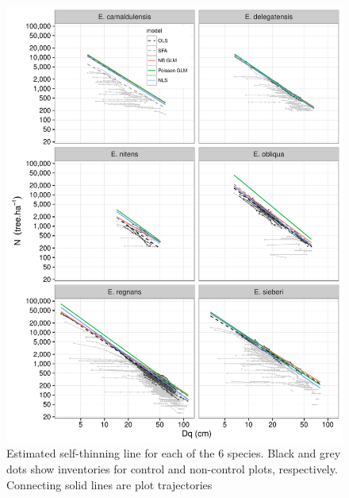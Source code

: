 \documentclass[12pt,english]{article}
\begin{document}
\begin{figure}%
	\centering
	\includegraphics[width=16cm]{fig2.pdf}
	\caption{Estimated self-thinning line for each of the 6 species. Black and grey dots show inventories for control and non-control plots, respectively. Connecting solid lines are plot trajectories}
	\label{fig:fig2}
\end{figure}
\end{document}

